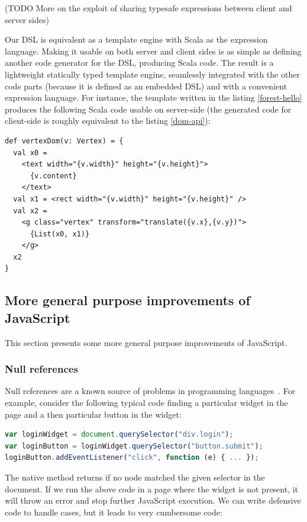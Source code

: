 \documentclass[american,english,runningheads]{llncs}
\begin{document}
(TODO More on the exploit of sharing typesafe expressions between client and server sides)

Our DSL is equivalent as a template engine with Scala as the expression language. Making it usable on both server and client sides is as simple as defining another code generator for the DSL, producing Scala code. The result is a lightweight statically typed template engine, seamlessly integrated with the other code parts (because it is defined as an embedded DSL) and with a convenient expression language. For instance, the template written in the listing \ref{forest-hello} produces the following Scala code usable on server-side (the generated code for client-side is roughly equivalent to the listing \ref{dom-api}):

\begin{lstlisting}
def vertexDom(v: Vertex) = {
  val x0 =
    <text width="{v.width}" height="{v.height}">
      {v.content}
    </text>
  val x1 = <rect width="{v.width}" height="{v.height}" />
  val x2 =
    <g class="vertex" transform="translate({v.x},{v.y})">
      {List(x0, x1)}
    </g>
  x2
}
\end{lstlisting}

\subsection{More general purpose improvements of JavaScript}

This section presents some more general purpose improvements of JavaScript.

\subsubsection{Null references}

Null references are a known source of problems in programming languages~\cite{Hoare09_Null,Nanda09_Null}. For example, consider the following typical code finding a particular widget in the page and a then particular button in the widget:

\begin{lstlisting}[language=JavaScript,label=null-unsafe,caption=Unsafe code]
var loginWidget = document.querySelector("div.login");
var loginButton = loginWidget.querySelector("button.submit");
loginButton.addEventListener("click", function (e) { ... });
\end{lstlisting}

The native  method returns  if no node matched the given selector in the document. If we run the above code in a page where the widget is not present, it will throw an error and stop further JavaScript execution. We can write defensive code to handle  cases, but it leads to very cumbersome code:
\end{document}
